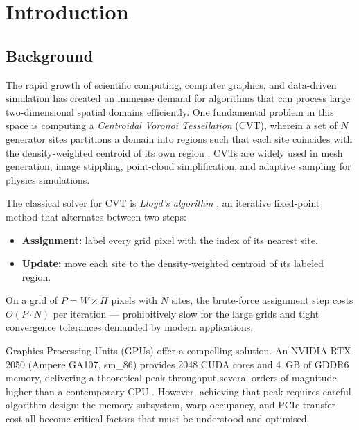 \documentclass[12pt,a4paper]{article}
\begin{document}
    

    \renewcommand*\contentsname{Table of Contents}
    \tableofcontents
    \newpage
    \newpage
    \listoffigures
    \newpage
    \newpage
    \listoftables
    \newpage

\section{Introduction}

\subsection{Background}

The rapid growth of scientific computing, computer graphics, and data-driven
simulation has created an immense demand for algorithms that can process large
two-dimensional spatial domains efficiently.  One fundamental problem in this
space is computing a \textit{Centroidal Voronoi Tessellation} (CVT), wherein a
set of $N$ generator sites partitions a domain into regions such that each site
coincides with the density-weighted centroid of its own region
\cite{du1999centroidal}.  CVTs are widely used in mesh generation, image
stippling, point-cloud simplification, and adaptive sampling for physics
simulations.

The classical solver for CVT is \textit{Lloyd's algorithm} \cite{lloyd1982least},
an iterative fixed-point method that alternates between two steps:
\begin{itemize}
    \item \textbf{Assignment:} label every grid pixel with the index of its
          nearest site.
    \item \textbf{Update:} move each site to the density-weighted centroid of its
          labeled region.
\end{itemize}
On a grid of $P = W \times H$ pixels with $N$ sites, the brute-force assignment
step costs $O(P \cdot N)$ per iteration --- prohibitively slow for the large
grids and tight convergence tolerances demanded by modern applications.

Graphics Processing Units (GPUs) offer a compelling solution.  An NVIDIA RTX
2050 (Ampere GA107, sm\_86) provides 2048 CUDA cores and 4~GB of GDDR6 memory,
delivering a theoretical peak throughput several orders of magnitude higher than
a contemporary CPU \cite{kirk2022programming}.  However, achieving that peak
requires careful algorithm design: the memory subsystem, warp occupancy, and
PCIe transfer cost all become critical factors that must be understood and
optimised.
\end{document}
